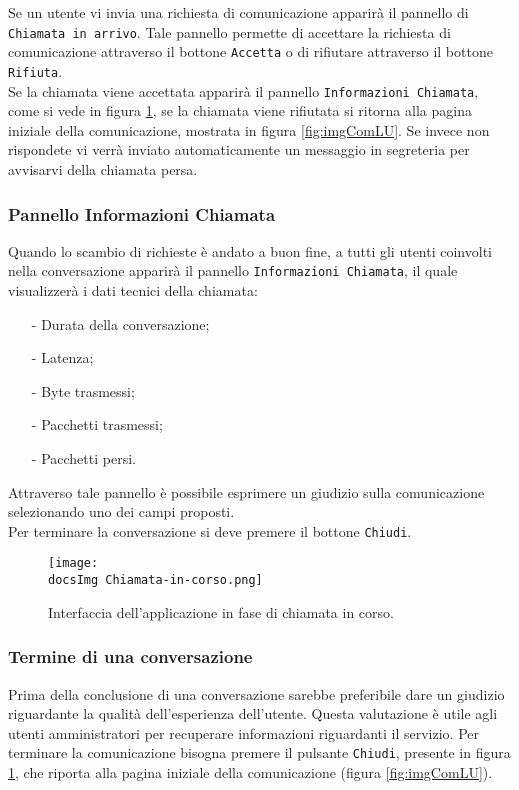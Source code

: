 {{{Se un utente vi invia una richiesta di comunicazione apparirà il pannello di \texttt{Chiamata in arrivo}. Tale pannello permette di accettare la richiesta di comunicazione attraverso il bottone \texttt{Accetta} o di rifiutare attraverso il bottone \texttt{Rifiuta}.\\
Se la chiamata viene accettata apparirà il pannello \texttt{Informazioni Chiamata}, come si vede in figura \ref{fig:imgComInCorso}, se la chiamata viene rifiutata si ritorna alla pagina iniziale della comunicazione, mostrata in figura \ref{fig:imgComLU}.
Se invece non rispondete vi verrà inviato automaticamente un messaggio in segreteria per avvisarvi della chiamata persa.
}

\newpage

\subsubsection{Pannello Informazioni Chiamata}{


Quando lo scambio di richieste è andato a buon fine, a tutti gli utenti coinvolti nella conversazione apparirà il pannello \texttt{Informazioni Chiamata}, il quale visualizzerà i dati tecnici della chiamata:
	\begin{itemize}
	\item[-] Durata della conversazione;
	\item[-] Latenza;
	\item[-] Byte trasmessi;
	\item[-] Pacchetti trasmessi;
	\item[-] Pacchetti persi.
	\end{itemize}
Attraverso tale pannello è possibile esprimere un giudizio sulla comunicazione selezionando uno dei campi proposti.\\
Per terminare la conversazione si deve premere il bottone \texttt{Chiudi}.

\begin{figure}[h!]
	\centering
		\texttt{[image: \\docsImg Chiamata-in-corso.png]}
		\caption{Interfaccia dell'applicazione in fase di chiamata in corso.} 
		\label{fig:imgComInCorso}
	\end{figure}
}

\subsubsection{Termine di una conversazione}{

Prima della conclusione di una conversazione sarebbe preferibile dare un giudizio riguardante la qualità dell’esperienza dell’utente. Questa valutazione è utile agli utenti amministratori per recuperare informazioni riguardanti il servizio.
Per terminare la comunicazione bisogna premere il pulsante \texttt{Chiudi}, presente in figura \ref{fig:imgComInCorso}, che riporta alla pagina iniziale della comunicazione (figura \ref{fig:imgComLU}).
}

}}
